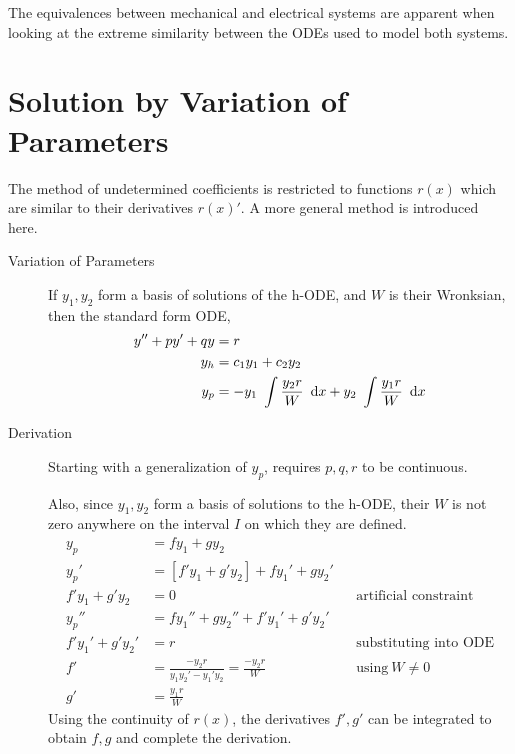 The equivalences between mechanical and electrical systems are apparent when looking at
the extreme similarity between the ODEs used to model both systems.

\section{Solution by Variation of Parameters}

The method of undetermined coefficients is restricted to functions $ r(x) $ which are similar
to their derivatives $ r(x)' $. A more general method is introduced here.

\begin{description}
    \item[Variation of Parameters] If $ y_{1}, y_{2} $ form a basis of solutions of the h-ODE,
        and $ W $ is their Wronksian, then the standard form ODE,
        \begin{align}
            y'' + py' + qy & = r                                                                          \\
            y_{h}          & = c_{1}y_{1} + c_{2}y_{2}                                                    \\
            y_{p}          & = -y_{1}\ \int \frac{y_{2}r}{W}\ \dl x + y_{2}\ \int \frac{y_{1}r}{W}\ \dl x
        \end{align}
    \item[Derivation] Starting with a generalization of $ y_{p} $, requires $ p, q, r $ to be
        continuous. \par

        Also, since $ y_{1}, y_{2} $ form a basis of solutions to the h-ODE, their $ W $
        is not zero  anywhere on the interval $ I $ on which they are defined.
        \begin{align}
            y_{p}               & = fy_{1} + gy_{2}                                                                                  \\
            y_{p}'              & = [f'y_{1} + g'y_{2}] + fy_{1}' + gy_{2}'                                                          \\
            f'y_{1} + g'y_{2}   & = 0                                                              &  & \text{artificial constraint} \\
            y_{p}''             & = fy_{1}'' + gy_{2}'' + f'y_{1}' + g'y_{2}'                                                        \\
            f'y_{1}' + g'y_{2}' & = r                                                              &  & \text{substituting into ODE} \\
            f'                  & = \frac{-y_{2}r}{y_{1}y_{2}' - y_{1}'y_{2}} = \frac{-y_{2} r}{W} &  & \text{using}\ W \neq 0       \\
            g'                  & = \frac{y_{1}r}{W}
        \end{align}
        Using the continuity of $ r(x) $, the derivatives $ f', g' $ can be integrated to obtain
        $ f, g $ and complete the derivation.
\end{description}